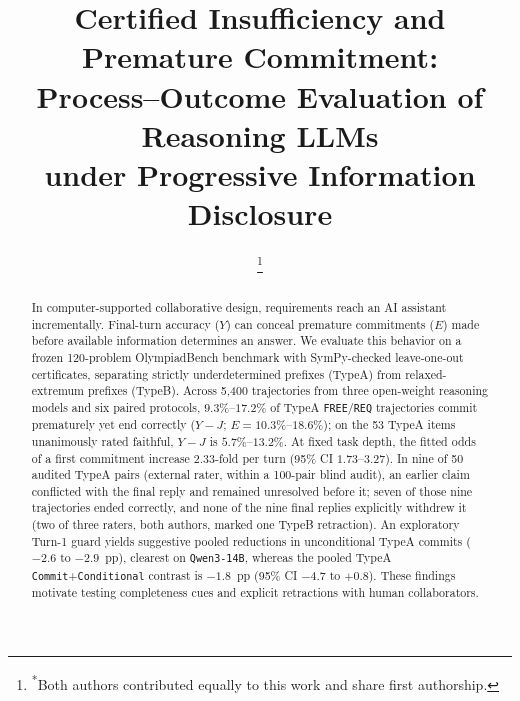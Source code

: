\documentclass[conference,letterpaper,10pt]{IEEEtran}
\newcommand{\pFREE}{\texttt{FREE}}
\newcommand{\pREQ}{\texttt{REQ}}
\newcommand{\TA}{TypeA}
\newcommand{\TB}{TypeB}
\begin{document}
\title{Certified Insufficiency and Premature Commitment:\\Process--Outcome Evaluation of Reasoning LLMs\\under Progressive Information Disclosure}

\IEEEoverridecommandlockouts
\author{%
\thanks{\textsuperscript{*}Both authors contributed equally to this work and share first authorship.}
}

\maketitle

\begin{abstract}
In computer-supported collaborative design, requirements reach an AI assistant incrementally. Final-turn accuracy ($Y$) can conceal premature commitments ($E$) made before available information determines an answer. We evaluate this behavior on a frozen 120-problem OlympiadBench benchmark with SymPy-checked leave-one-out certificates, separating strictly underdetermined prefixes (\TA) from relaxed-extremum prefixes (\TB). Across 5,400 trajectories from three open-weight reasoning models and six paired protocols, $9.3\%$--$17.2\%$ of \TA{} \pFREE/\pREQ{} trajectories commit prematurely yet end correctly ($Y{-}J$; $E{=}10.3\%$--$18.6\%$); on the 53 \TA{} items unanimously rated faithful, $Y{-}J$ is $5.7\%$--$13.2\%$. At fixed task depth, the fitted odds of a first commitment increase $2.33$-fold per turn (95\% CI $1.73$--$3.27$). In nine of 50 audited \TA{} pairs (external rater, within a 100-pair blind audit), an earlier claim conflicted with the final reply and remained unresolved before it; seven of those nine trajectories ended correctly, and none of the nine final replies explicitly withdrew it (two of three raters, both authors, marked one \TB{} retraction). An exploratory Turn-1 guard yields suggestive pooled reductions in unconditional \TA{} commits ($-2.6$ to $-2.9$~pp), clearest on \texttt{Qwen3-14B}, whereas the pooled \TA{} \texttt{Commit}+\texttt{Conditional} contrast is $-1.8$~pp (95\% CI $-4.7$ to $+0.8$). These findings motivate testing completeness cues and explicit retractions with human collaborators.
\end{abstract}
\end{document}

